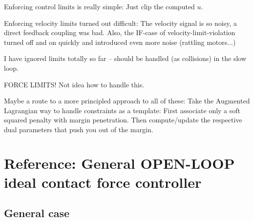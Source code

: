 \documentclass[10pt,fleqn,twoside]{article}
\begin{document}
Enforcing control limits is really simple: Just clip the computed $u$.

Enforcing velocity limits turned out difficult: The velocity
signal is so noisy, a direct feedback coupling was bad. Also, the
IF-case of velocity-limit-violation turned off and on quickly and
introduced even more noise (rattling motors...)

I have ignored limits totally so far -- should be handled (as
collisions) in the slow loop.

FORCE LIMITS! Not idea how to handle this.

Maybe a route to a more principled approach to all of these: Take the
Augmented Lagrangian way to handle constraints as a template: First
associate only a soft squared penalty with margin penetration. Then
compute/update the respective dual parameters that push you out of the
margin.

\appendix

\section{Reference: General OPEN-LOOP ideal contact force controller}

\subsection{General case}
\end{document}
